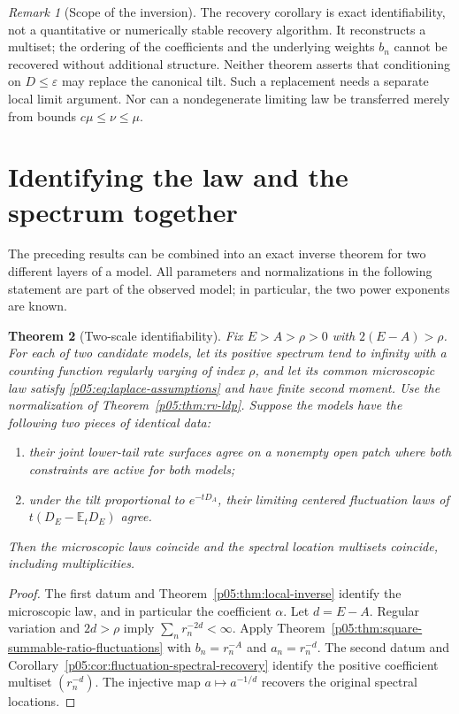\documentclass[11pt,letterpaper]{article}
\newtheorem{theorem}{Theorem}[section]
\theoremstyle{definition}
\theoremstyle{remark}
\newtheorem{remark}[theorem]{Remark}
\newcommand{\1}{\mathbf 1}
\begin{document}
\begin{remark}[Scope of the inversion]
The recovery corollary is exact identifiability, not a quantitative
or numerically stable recovery algorithm.  It reconstructs a multiset;
the ordering of the coefficients and the underlying weights $b_n$
cannot be recovered without additional structure.  Neither theorem
asserts that conditioning on $D\le\varepsilon$ may replace the
canonical tilt.  Such a replacement needs a separate local limit
argument.  Nor can a nondegenerate limiting law be transferred merely
from bounds $c\mu\le\nu\le\mu$.
\end{remark}


\section{Identifying the law and the spectrum together}
\label{p05:sec:two-scale}

The preceding results can be combined into an exact inverse theorem
for two different layers of a model. All parameters and normalizations
in the following statement are part of the observed model; in
particular, the two power exponents are known.

\begin{theorem}[Two-scale identifiability]\label{p05:thm:two-scale}
Fix $E>A>\rho>0$ with $2(E-A)>\rho$. For each of two candidate models,
let its positive spectrum tend to infinity with a counting function
regularly varying of index $\rho$, and let its common microscopic law
satisfy \eqref{p05:eq:laplace-assumptions} and have finite second moment.
Use the normalization of Theorem~\ref{p05:thm:rv-ldp}.
Suppose the models have the following two pieces of identical data:
\begin{enumerate}[label=(\roman*)]
\item their joint lower-tail rate surfaces agree on a nonempty open
patch where both constraints are active for both models;
\item under the tilt proportional to $e^{-tD_A}$, their limiting
centered fluctuation laws of $t(D_E-\mathbb E_tD_E)$ agree.
\end{enumerate}
Then the microscopic laws coincide and the spectral location
multisets coincide, including multiplicities.
\end{theorem}

\begin{proof}
The first datum and Theorem~\ref{p05:thm:local-inverse} identify the
microscopic law, and in particular the coefficient $\alpha$.
Let $d=E-A$. Regular variation and $2d>\rho$ imply
$\sum_n r_n^{-2d}<\infty$. Apply
Theorem~\ref{p05:thm:square-summable-ratio-fluctuations} with
$b_n=r_n^{-A}$ and $a_n=r_n^{-d}$. The second datum and
Corollary~\ref{p05:cor:fluctuation-spectral-recovery} identify the positive
coefficient multiset $(r_n^{-d})$. The injective map
$a\mapsto a^{-1/d}$ recovers the original spectral locations.
\end{proof}
\end{document}
